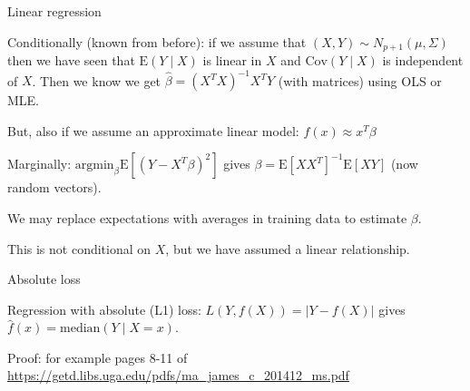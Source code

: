 \documentclass[
  ignorenonframetext,
]{beamer}
\begin{document}
\begin{frame}

\begin{block}{Linear regression}

Conditionally (known from before): if we assume that
\((X,Y) \sim N_{p+1}(\mu,\Sigma)\) then we have seen that
\(\text{E}(Y\mid X)\) is linear in \(X\) and \(\text{Cov}(Y \mid X)\) is
independent of \(X\). Then we know we get
\(\hat{\beta}=(X^TX)^{-1}X^T Y\) (with matrices) using OLS or MLE.

\end{block}

\end{frame}

\begin{frame}

But, also if we assume an approximate linear model:
\(f(x)\approx x^T \beta\)

Marginally: \(\text{argmin}_{\beta} \text{E}[(Y-X^T\beta)^2]\) gives
\(\beta=\text{E}[X X^T]^{-1}\text{E}[XY]\) (now random vectors).

We may replace expectations with averages in training data to estimate
\(\beta\).

This is not conditional on \(X\), but we have assumed a linear
relationship.

\end{frame}

\begin{frame}

\begin{block}{Absolute loss}

Regression with absolute (L1) loss: \(L(Y,f(X))=\lvert Y-f(X) \rvert\)
gives \(\hat{f}(x)=\text{median}(Y\mid X=x)\).

Proof: for example pages 8-11 of
\url{https://getd.libs.uga.edu/pdfs/ma_james_c_201412_ms.pdf}

\end{block}

\end{frame}
\end{document}
